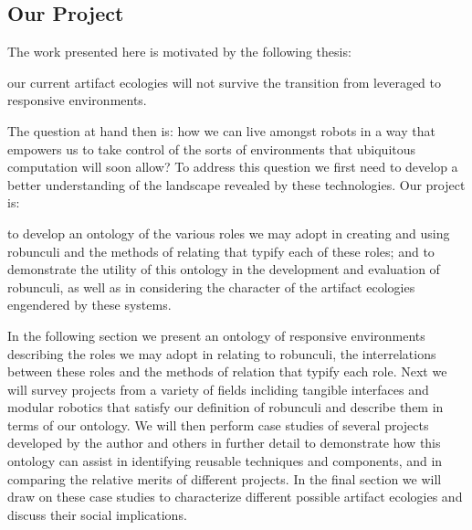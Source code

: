 \subsection{Our Project}
%
The work presented here is motivated by the following thesis:

\begin{em}
our current artifact ecologies will not survive the transition from leveraged to responsive environments.
\end{em}

The question at hand then is: how we can live amongst robots in a way that empowers us to take control of the sorts of environments that ubiquitous computation will soon allow? To address this question we first need to develop a better understanding of the landscape revealed by these technologies. Our project is:

\begin{em}
to develop an ontology of the various roles we may adopt in creating and using robunculi and the methods of relating that typify each of these roles; and to demonstrate the utility of this ontology in the development and evaluation of robunculi, as well as in considering the character of the artifact ecologies engendered by these systems.
\end{em}

In the following section we present an ontology of responsive environments describing the roles we may adopt in relating to robunculi, the interrelations between these roles and the methods of relation that typify each role. Next we will survey projects from a variety of fields incliding tangible interfaces and modular robotics that satisfy our definition of robunculi and describe them in terms of our ontology. We will then perform case studies of several projects developed by the author and others in further detail to demonstrate how this ontology can assist in identifying reusable techniques and components, and in comparing the relative merits of different projects. In the final section we will draw on these case studies to characterize different possible artifact ecologies and discuss their social implications.




